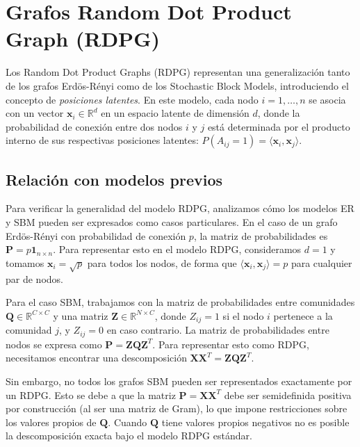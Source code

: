 \documentclass{article}
\begin{document}
\FloatBarrier
\section{Grafos Random Dot Product Graph (RDPG)}
\label{sec:rdpg}

Los Random Dot Product Graphs (RDPG) representan una generalización tanto de los grafos Erdös-Rényi como de los Stochastic Block Models, introduciendo el concepto de \emph{posiciones latentes}. En este modelo, cada nodo $i = 1, \ldots, n$ se asocia con un vector $\mathbf{x}_i \in \mathbb{R}^d$ en un espacio latente de dimensión $d$, donde la probabilidad de conexión entre dos nodos $i$ y $j$ está determinada por el producto interno de sus respectivas posiciones latentes: $P(A_{ij} = 1) = \langle \mathbf{x}_i, \mathbf{x}_j \rangle$.

\subsection{Relación con modelos previos}

Para verificar la generalidad del modelo RDPG, analizamos cómo los modelos ER y SBM pueden ser expresados como casos particulares. En el caso de un grafo Erdös-Rényi con probabilidad de conexión $p$, la matriz de probabilidades es $\mathbf{P} = p \mathbf{1}_{n \times n}$. Para representar esto en el modelo RDPG, consideramos $d=1$ y tomamos $\mathbf{x}_i = \sqrt{p}$ para todos los nodos, de forma que $\langle \mathbf{x}_i, \mathbf{x}_j \rangle = p$ para cualquier par de nodos.

Para el caso SBM, trabajamos con la matriz de probabilidades entre comunidades $\mathbf{Q} \in \mathbb{R}^{C \times C}$ y una matriz $\mathbf{Z} \in \mathbb{R}^{N \times C}$, donde $Z_{ij} = 1$ si el nodo $i$ pertenece a la comunidad $j$, y $Z_{ij} = 0$ en caso contrario. La matriz de probabilidades entre nodos se expresa como $\mathbf{P} = \mathbf{Z}\mathbf{Q}\mathbf{Z}^T$. Para representar esto como RDPG, necesitamos encontrar una descomposición $\mathbf{X}\mathbf{X}^T = \mathbf{Z}\mathbf{Q}\mathbf{Z}^T$.

Sin embargo, no todos los grafos SBM pueden ser representados exactamente por un RDPG. Esto se debe a que la matriz $\mathbf{P} = \mathbf{X}\mathbf{X}^T$ debe ser semidefinida positiva por construcción (al ser una matriz de Gram), lo que impone restricciones sobre los valores propios de $\mathbf{Q}$. Cuando $\mathbf{Q}$ tiene valores propios negativos no es posible la descomposición exacta bajo el modelo RDPG estándar.
\end{document}

